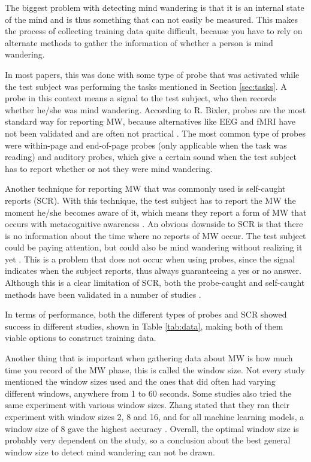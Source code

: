 The biggest problem with detecting mind wandering is that it is an internal state of the mind and is thus something that can not easily be measured. This makes the process of collecting training data quite difficult, because you have to rely on alternate methods to gather the information of whether a person is mind wandering.

In most papers, this was done with some type of probe that was activated while the test subject was performing the tasks mentioned in Section \ref{sec:tasks}. A probe in this context means a signal to the test subject, who then records whether he/she was mind wandering. According to R. Bixler, probes are the most standard way for reporting MW, because alternatives like EEG and fMRI have not been validated and are often not practical \cite{Bixler2015AutomaticPhysiology}. The most common type of probes were within-page and end-of-page probes (only applicable when the task was reading) and auditory probes, which give a certain sound when the test subject has to report whether or not they were mind wandering.

Another technique for reporting MW that was commonly used is self-caught reports (SCR). With this technique, the test subject has to report the MW the moment he/she becomes aware of it, which means they report a form of MW that occurs with metacognitive awareness \cite{Bixler2015AutomaticAwareness}. An obvious downside to SCR is that there is no information about the time where no reports of MW occur. The test subject could be paying attention, but could also be mind wandering without realizing it yet \cite{Bixler2015AutomaticAwareness}. This is a problem that does not occur when using probes, since the signal indicates when the subject reports, thus always guaranteeing a yes or no answer. Although this is a clear limitation of SCR, both the probe-caught and self-caught methods have been validated in a number of studies \cite{Bixler2015AutomaticPhysiology}. 

In terms of performance, both the different types of probes and SCR showed success in different studies, shown in Table \ref{tab:data}, making both of them viable options to construct training data. 

Another thing that is important when gathering data about MW is how much time you record of the MW phase, this is called the window size. Not every study mentioned the window sizes used and the ones that did often had varying different windows, anywhere from 1 to 60 seconds. Some studies also tried the same experiment with various window sizes. Zhang stated that they ran their experiment with window sizes 2, 8 and 16, and for all machine learning models, a window size of 8 gave the highest accuracy \cite{ISI:000443429900018}. Overall, the optimal window size is probably very dependent on the study, so a conclusion about the best general window size to detect mind wandering can not be drawn.